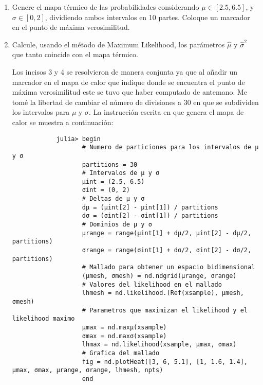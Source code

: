 \begin{enumerate}
\begin{solution}
    \end{solution}
    \item Genere el mapa térmico de las probabilidades considerando $\mu \in \left[2.5, 6.5\right]$, y $\sigma \in \left[0, 2\right]$, dividiendo ambos intervalos en 10 partes. Coloque un marcador en el punto de máxima verosimilitud.
    \item Calcule, usando el método de Maximum Likelihood, los parámetros $\hat{\mu}$ y $\hat{\sigma}^2$ que tanto coincide con el mapa térmico.
    \begin{solution}
        Los incisos 3 y 4 se resolvieron de manera conjunta ya que al añadir un marcador en el mapa de calor que indique donde se encuentra el punto de máxima verosimilitud este se tuvo que haber computado de antemano. Me tomé la libertad de cambiar el número de divisiones a 30 en que se subdividen los intervalos para $\mu$ y $\sigma$. La instrucción escrita en  que genera el mapa de calor se muestra a continuación:
        \begin{verbatim}
            julia> begin 
                   # Numero de particiones para los intervalos de μ y σ
                   partitions = 30
                   # Intervalos de μ y σ
                   μint = (2.5, 6.5)
                   σint = (0, 2)
                   # Deltas de μ y σ
                   dμ = (μint[2] - μint[1]) / partitions
                   dσ = (σint[2] - σint[1]) / partitions
                   # Dominios de μ y σ
                   μrange = range(μint[1] + dμ/2, μint[2] - dμ/2, partitions)
                   σrange = range(σint[1] + dσ/2, σint[2] - dσ/2, partitions)
                   # Mallado para obtener un espacio bidimensional
                   (μmesh, σmesh) = nd.ndgrid(μrange, σrange)
                   # Valores del likelihood en el mallado
                   lhmesh = nd.likelihood.(Ref(xsample), μmesh, σmesh)
                   # Parametros que maximizan el likelihood y el likelihood maximo
                   μmax = nd.maxμ(xsample)
                   σmax = nd.maxσ(xsample)
                   lhmax = nd.likelihood(xsample, μmax, σmax)
                   # Grafica del mallado
                   fig = nd.plotHeat([3, 6, 5.1], [1, 1.6, 1.4], μmax, σmax, μrange, σrange, lhmesh, npts)
                   end

\end{verbatim}
\end{solution}
\end{enumerate}

